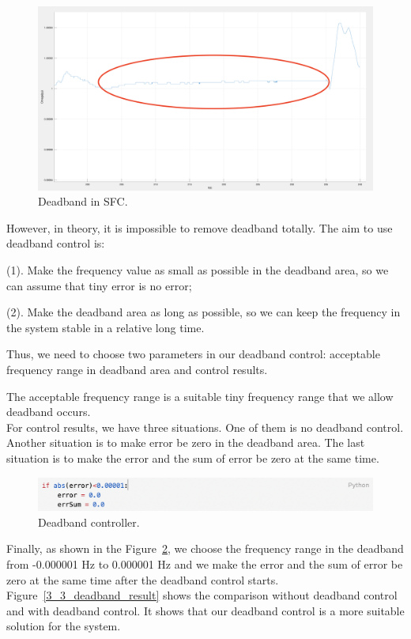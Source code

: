\begin{figure}[!htbp]
\center
\includegraphics[scale=0.3]{figure/3_3_deadband.png}
\caption{Deadband in SFC.}
\label{3_3_deadband}
\end{figure}


However, in theory, it is impossible to remove deadband totally. The aim to use deadband control is: 
	
    (1). Make the frequency value as small as possible in the deadband area, so we can assume that tiny error is no error;
    
	(2). Make the deadband area as long as possible, so we can keep the frequency in the system stable in a relative long time. 

Thus, we need to choose two parameters in our deadband control: acceptable frequency range in deadband area and control results. 

The acceptable frequency range is a suitable tiny frequency range that we allow deadband occurs.\\

For control results, we have three situations. One of them is no deadband control. Another situation is to make error be zero in the deadband area. The last situation is to make the error and the sum of error be zero at the same time.

\begin{figure}[htbp]
\center
\includegraphics[scale=0.65]{figure/3_3_deadband_code.png}
\caption{Deadband controller.}
\label{3_3_deadband_code}
\end{figure}

Finally, as shown in the Figure~\ref{3_3_deadband_code}, we choose the frequency range in the deadband from -0.000001 Hz to 0.000001 Hz and we make the error and the sum of error be zero at the same time after the deadband control starts. Figure~\ref{3_3_deadband_result} shows the comparison without deadband control and with deadband control. It shows that our deadband control is a more suitable solution for the system. 


